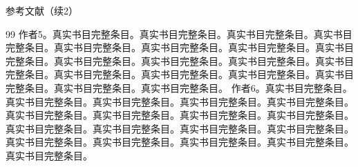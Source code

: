\documentclass[aspectratio=169,10pt,fontset=fandol]{ctexbeamer}
\begin{document}
\begin{frame}[t,fragile]{参考文献（续2）}
\footnotesize
{\footnotesize
\begin{thebibliography}{99}
 作者5。真实书目完整条目。真实书目完整条目。真实书目完整条目。真实书目完整条目。真实书目完整条目。真实书目完整条目。真实书目完整条目。真实书目完整条目。真实书目完整条目。真实书目完整条目。真实书目完整条目。真实书目完整条目。真实书目完整条目。真实书目完整条目。真实书目完整条目。真实书目完整条目。真实书目完整条目。真实书目完整条目。
 作者6。真实书目完整条目。真实书目完整条目。真实书目完整条目。真实书目完整条目。真实书目完整条目。真实书目完整条目。真实书目完整条目。真实书目完整条目。真实书目完整条目。真实书目完整条目。真实书目完整条目。真实书目完整条目。真实书目完整条目。真实书目完整条目。真实书目完整条目。真实书目完整条目。真实书目完整条目。真实书目完整条目。\end{thebibliography}
}
\end{frame}
\end{document}
